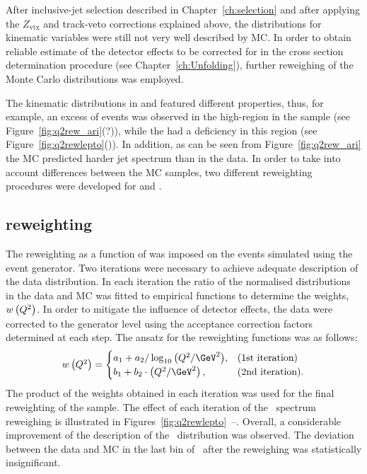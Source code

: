 After inclusive-jet selection described in Chapter~\ref{ch:selection} and after applying the $Z_\text{vtx}$ and track-veto corrections explained above, the distributions for kinematic variables were still not very well described by MC. In order to obtain reliable estimate of the detector effects to be corrected for in the cross section determination procedure (see Chapter~\ref{ch:Unfolding}), further reweighing of the Monte Carlo distributions was employed. 

The kinematic distributions in \lepto and \ariadne featured different properties, thus, for example, an excess of events was observed in the high-\qsq region in the \ariadne sample (see Figure~\ref{fig:q2rew_ari}(?)), while the \lepto had a deficiency in this region (see Figure~\ref{fig:q2rewlepto}()). In addition, as can be seen from Figure~\ref{fig:q2rew_ari} the \ariadne MC predicted harder jet spectrum than in the data. In order to take into account differences between the MC samples, two different reweighting procedures were developed for \lepto and \ariadne.

\subsection{\lepto reweighting}
The reweighting as a function of \qsq was imposed on the events simulated using the \lepto event generator. Two iterations were necessary to achieve adequate description of the data distribution. In each iteration the ratio of the normalised \qsq distributions in the data and MC was fitted to empirical functions to determine the weights, $w\left( \mbox{${Q^2}$}\right) $. In order to mitigate the influence of detector effects, the data were corrected to the generator level using the acceptance correction factors determined at each step. The ansatz for the reweighting functions was as follows:
\begin{equation}
w\left( \qsq\right) = 
\begin{cases}
a_1 + a_2 / \log_{10}{\left( \qsq/\GeV^2\right) }, & \text{(1st iteration)} \\
b_1 + b_2 \cdot \left( \qsq/\GeV^2\right) ,            & \text{(2nd iteration)}.
\end{cases}
\end{equation}
The product of the weights obtained in each iteration was used for the final reweighting of the \lepto sample. The effect of each iteration of the \qsq~spectrum reweighing is illustrated in Figures~\ref{fig:q2rewlepto}~--. Overall, a considerable improvement of the description of the \qsq~distribution was observed. The deviation between the data and MC in the last bin of \qsq~after the reweighing was statistically insignificant.

